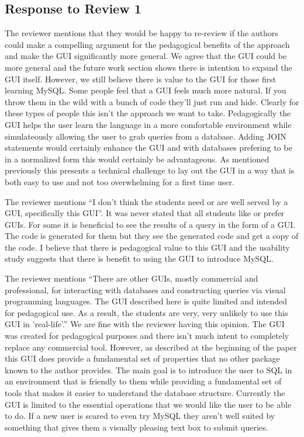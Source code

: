 \documentclass[11pt]{tise_style}
\begin{document}
\subsection{Response to Review 1}

The reviewer mentions that they would be happy to re-review if the authors could make a compelling argument for the pedagogical benefits of the approach and make the GUI significantly more general.  We agree that the GUI could be more general and the future work section shows there is intention to expand the GUI itself.  However, we still believe there is value to the GUI for those first learning MySQL.  Some people feel that a GUI feels much more natural.  If you throw them in the wild with a bunch of code they'll just run and hide.  Clearly for these types of people this isn't the approach we want to take. Pedagogically the GUI helps the user learn the language in a more comfortable environment while simulateously allowing the user to grab queries from a database.  Adding JOIN statements would certainly enhance the GUI and with databases prefering to be in a normalized form this would certainly be advantageous.  As mentioned previously this presents a technical challenge to lay out the GUI in a way that is both easy to use and not too overwhelming for a first time user.

The reviewer mentions ``I don't think the students need or are well served by a GUI, specifically this GUI''.  It was never stated that all students like or prefer GUIs.  For some it is beneficial to see the results of a query in the form of a GUI.  The code is generated for them but they see the generated code and get a copy of the code.  I believe that there is pedagogical value to this GUI and the usability study suggests that there is benefit to using the GUI to introduce MySQL.

The reviewer mentions ``There are other GUIs, mostly commercial and professional, for interacting with databases and constructing queries via visual programming languages.  The GUI described here is quite limited and intended for pedagogical use.  As a result, the students are very, very unlikely to use this GUI in 'real-life'.''  We are fine with the reviewer having this opinion.  The GUI was created for pedagogical purposes and there isn't much intent to completely replace any commercial tool.  However, as described at the beginning of the paper this GUI does provide a fundamental set of properties that no other package known to the author provides.  The main goal is to introduce the user to SQL in an environment that is friendly to them while providing a fundamental set of tools that makes it easier to understand the database structure.  Currently the GUI is limited to the essential operations that we would like the user to be able to do.  If a new user is scared to even try MySQL they aren't well suited by something that gives them a visually pleasing text box to submit queries.
\end{document}
